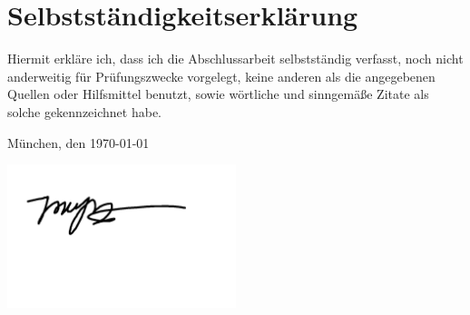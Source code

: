\section*{Selbstständigkeitserklärung}

\begin{flushleft}
    Hiermit erkläre ich, dass ich die Abschlussarbeit selbstständig verfasst, noch nicht anderweitig für
    Prüfungszwecke vorgelegt, keine anderen als die angegebenen Quellen oder Hilfsmittel benutzt,
    sowie wörtliche und sinngemäße Zitate als solche gekennzeichnet habe.

\vspace{2em}

München, den \today

\vspace{2em}

\includegraphics[width=0.5\textwidth]{logos/signature.png}
\end{flushleft}